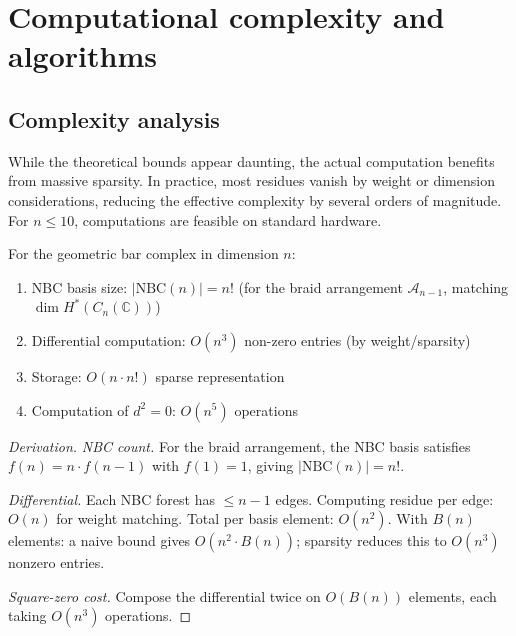 \section{Computational complexity and algorithms}

\subsection{Complexity analysis}

\begin{remark}[Implementation]
While the theoretical bounds appear daunting,
the actual computation benefits from massive sparsity. In practice, most residues vanish
by weight or dimension considerations, reducing the effective complexity by several orders
of magnitude. For $n \leq 10$, computations are feasible on standard hardware.
\end{remark}

\begin{theorem}
\label{thm:complexity-bounds}
For the geometric bar complex in dimension $n$:
\begin{enumerate}
\item NBC basis size: $|\mathrm{NBC}(n)| = n!$ (for the braid arrangement $\mathcal{A}_{n-1}$, matching $\dim H^*(C_n(\mathbb{C}))$)
\item Differential computation: $O(n^3)$ non-zero entries (by weight/sparsity)
\item Storage: $O(n \cdot n!)$ sparse representation
\item Computation of $d^2=0$: $O(n^5)$ operations
\end{enumerate}
\end{theorem}

\begin{proof}[Derivation]
\emph{NBC count.} For the braid arrangement, the NBC basis satisfies $f(n) = n \cdot f(n-1)$
with $f(1) = 1$, giving $|\mathrm{NBC}(n)| = n!$.

\emph{Differential.} Each NBC forest has $\leq n-1$ edges.
Computing residue per edge: $O(n)$ for weight matching.
Total per basis element: $O(n^2)$.
With $B(n)$ elements: a naive bound gives $O(n^2 \cdot B(n))$; sparsity reduces this to $O(n^3)$ nonzero entries.

\emph{Square-zero cost.} Compose the differential twice on $O(B(n))$
elements, each taking $O(n^3)$ operations.
\end{proof}

